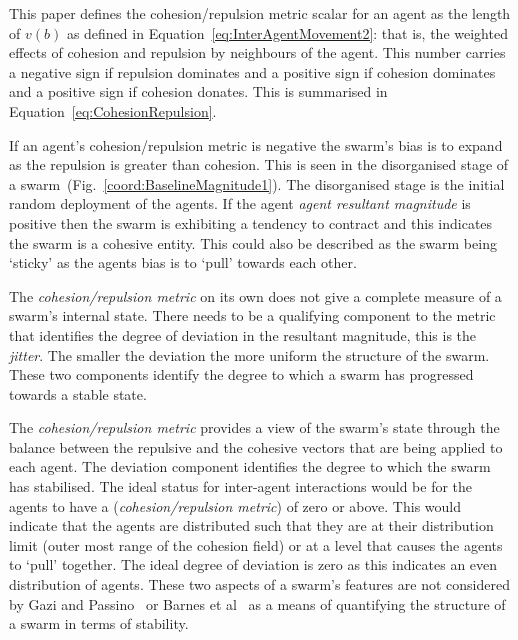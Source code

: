 \documentclass{ieeeaccess}
\begin{document}

This paper defines the cohesion/repulsion metric scalar for an agent as the length of $v(b)$  as defined in Equation~\ref{eq:InterAgentMovement2}: that is, the weighted effects of cohesion and repulsion by neighbours of the agent. This number carries a negative sign if repulsion dominates and a positive sign if cohesion dominates and a positive sign if cohesion donates. This is summarised in Equation~\ref{eq:CohesionRepulsion}.

If an agent's {cohesion/repulsion metric} is negative the swarm's bias is to expand as the repulsion is greater than cohesion. This is seen in the disorganised stage of a swarm~(Fig.~\ref{coord:BaselineMagnitude1}). The disorganised stage is the initial random deployment of the agents. If the agent \textit{agent resultant magnitude} is positive then the swarm is exhibiting a tendency to contract and this indicates the swarm is a cohesive entity. This could also be described as the swarm being `sticky' as the agents bias is to `pull' towards each other.

The \textit{cohesion/repulsion metric} on its own does not give a complete measure of a swarm's internal state. There needs to be a qualifying component to the metric that identifies the degree of deviation in the resultant magnitude, this is the \textit{jitter}. The smaller the deviation the more uniform the structure of the swarm. These two components identify the degree to which a swarm has progressed towards a stable state.
 
The \textit{cohesion/repulsion metric} provides a view of the swarm's state through the balance between the repulsive and the cohesive vectors that are being applied to each agent. The deviation component identifies the degree to which the swarm has stabilised. The ideal status for inter-agent interactions would be for the agents to have a (\textit{cohesion/repulsion metric}) of zero or above. This would indicate that the agents are distributed such that they are at their distribution limit (outer most range of the cohesion field) or at a level that causes the agents to `pull' together. The ideal degree of deviation is zero as this indicates an even distribution of agents. These two aspects of a swarm's features are not considered by Gazi and Passino~\cite{GP:11} or Barnes et al~\cite{BFV:07} as a means of quantifying the structure of a swarm in terms of stability.
\end{document}
